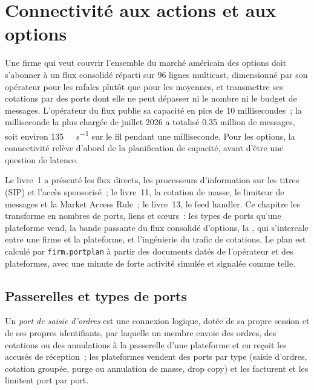 \chapter{Connectivité aux actions et aux options}\label{ch:nw:equities-and-options-connectivity}

Une firme qui veut couvrir l'ensemble du marché américain des options doit s'abonner à un flux consolidé réparti sur 96 lignes multicast, dimensionné par
son opérateur pour les rafales plutôt que pour les moyennes, et transmettre ses cotations par des ports dont elle ne peut dépasser
ni le nombre ni le budget de messages. L'opérateur du flux publie sa capacité en pics de 10 millisecondes~; la milliseconde la plus chargée de juillet 2026 a totalisé 0.35
million de messages, soit environ \qty{135}{\giga\bit\per\second} sur le fil pendant une milliseconde. Pour les options, la connectivité relève
d'abord de la planification de capacité, avant d'être une question de latence.

Le livre~1 a présenté les flux directs, les processeurs d'information sur les titres (SIP) et l'accès sponsorisé~; le livre~11, la cotation de masse, le
limiteur de messages et la Market Access Rule~; le livre~13, le feed handler. Ce chapitre les transforme en nombres de ports,
liens et cœurs~: les types de ports qu'une plateforme vend, la bande passante du flux consolidé d'options, la , qui s'intercale entre une firme et la plateforme, et l'ingénierie du trafic de cotations. Le plan est calculé par \texttt{firm.portplan}
à partir des documents datés de l'opérateur et des plateformes, avec une minute de forte activité simulée et signalée comme telle.

\section{Passerelles et types de ports}

\begin{definition}\label{def:nw:equities-and-options-connectivity:port}
Un \emph{port de saisie d'ordres} est une connexion logique, dotée de sa propre session et de ses propres identifiants, par
laquelle un membre envoie des ordres, des cotations ou des annulations à la passerelle d'une plateforme et en reçoit les accusés de réception~; les plateformes vendent
des ports par type (saisie d'ordres, cotation groupée, purge ou annulation de masse, drop copy) et les facturent et les limitent port par port.
\end{definition}

